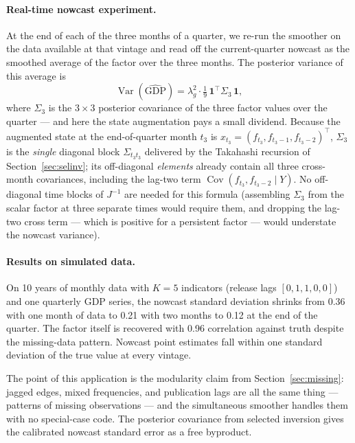 \documentclass[11pt]{article}
\newcommand{\Var}{\operatorname{Var}}
\newcommand{\Cov}{\operatorname{Cov}}
\begin{document}
\paragraph{Real-time nowcast experiment.}  At the end of each
of the three months of a quarter, we re-run the smoother on the
data available at that vintage and read off the current-quarter
nowcast as the smoothed average of the factor over the three
months.  The posterior variance of this average is
\begin{equation}
\Var(\widehat{\text{GDP}})=\lambda_g^2\cdot\tfrac19\,\mathbf 1^\top\Sigma_3\,\mathbf 1,
\end{equation}
where $\Sigma_3$ is the $3\times 3$ posterior covariance of the
three factor values over the quarter --- and here the state
augmentation pays a small dividend.  Because the augmented state at
the end-of-quarter month $t_3$ is
$x_{t_3}=(f_{t_3},f_{t_3-1},f_{t_3-2})^\top$, $\Sigma_3$ is the
\emph{single} diagonal block $\Sigma_{t_3 t_3}$ delivered by the
Takahashi recursion of Section~\ref{sec:selinv}; its off-diagonal
\emph{elements} already contain all three cross-month covariances,
including the lag-two term $\Cov(f_{t_3},f_{t_3-2}\mid Y)$.  No
off-diagonal time blocks of $J^{-1}$ are needed for this formula
(assembling $\Sigma_3$ from the scalar factor at three separate times
would require them, and dropping the lag-two cross term --- which is
positive for a persistent factor --- would understate the nowcast
variance).

\paragraph{Results on simulated data.}  On 10 years of monthly
data with $K=5$ indicators (release lags $[0,1,1,0,0]$) and one
quarterly GDP series, the nowcast standard deviation shrinks from
0.36 with one month of data to 0.21 with two months to 0.12 at the
end of the quarter.  The factor itself is recovered with 0.96
correlation against truth despite the missing-data pattern.
Nowcast point estimates fall within one standard deviation of the
true value at every vintage.

The point of this application is the modularity claim from
Section~\ref{sec:missing}: jagged edges, mixed frequencies, and
publication lags are all the same thing --- patterns of missing
observations --- and the simultaneous smoother handles them with no
special-case code.  The posterior covariance from selected inversion
gives the calibrated nowcast standard error as a free byproduct.
\end{document}

